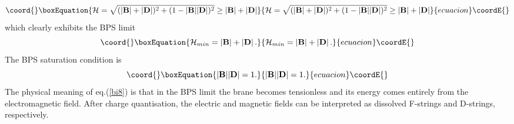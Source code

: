 \documentclass[a4paper,12pt]{article}
\begin{document}
\begin{equation}\coord{}\boxEquation{
{\cal H}=\sqrt{(|\m |+|\d |)^2+(1-|\m ||\d |)^2}\ge |\m |+|\d |
\label{bi7}
}{
{\cal H}=\sqrt{(|\m |+|\d |)^2+(1-|\m ||\d |)^2}\ge |\m |+|\d |
}{ecuacion}\coordE{}\end{equation}
which clearly exhibits the BPS limit
\begin{equation}\coord{}\boxEquation{
{\cal H}_{min}= |\m |+|\d |\, .
\label{bi8}
}{
{\cal H}_{min}= |\m |+|\d |\, .
}{ecuacion}\coordE{}\end{equation}
The BPS saturation condition is
\begin{equation}\coord{}\boxEquation{
|\m ||\d |=1.
\label{bi9}
}{
|\m ||\d |=1.
}{ecuacion}\coordE{}\end{equation}
The physical meaning of eq.(\ref{bi8})  is that in the BPS limit the brane becomes tensionless and its energy comes entirely  from the electromagnetic field. After charge quantisation, the electric and magnetic fields can be interpreted as dissolved  F-strings and D-strings, respectively.
\end{document}
